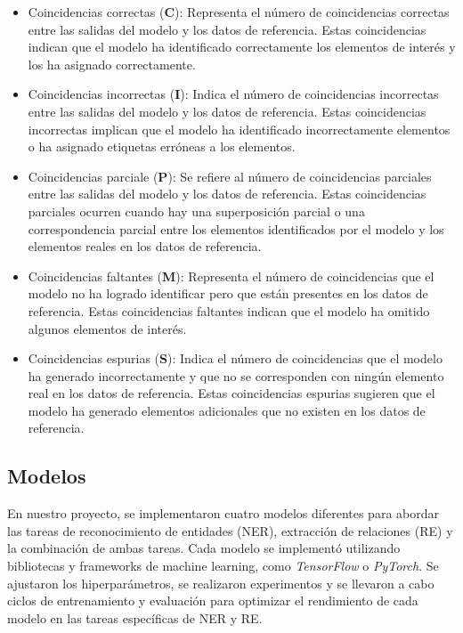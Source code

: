 \documentclass[10pt]{article} %
\begin{document}
	\begin{itemize}
		\item Coincidencias correctas (\textbf{C}): Representa el número de coincidencias correctas entre las salidas del modelo y los datos de referencia. Estas coincidencias indican que el modelo ha identificado correctamente los elementos de interés y los ha asignado correctamente.
		\item Coincidencias incorrectas (\textbf{I}): Indica el número de coincidencias incorrectas entre las salidas del modelo y los datos de referencia. Estas coincidencias incorrectas implican que el modelo ha identificado incorrectamente elementos o ha asignado etiquetas erróneas a los elementos.
		\item Coincidencias parciale (\textbf{P}): Se refiere al número de coincidencias parciales entre las salidas del modelo y los datos de referencia. Estas coincidencias parciales ocurren cuando hay una superposición parcial o una correspondencia parcial entre los elementos identificados por el modelo y los elementos reales en los datos de referencia.
		\item Coincidencias faltantes (\textbf{M}): Representa el número de coincidencias que el modelo no ha logrado identificar pero que están presentes en los datos de referencia. Estas coincidencias faltantes indican que el modelo ha omitido algunos elementos de interés.
		\item Coincidencias espurias (\textbf{S}): Indica el número de coincidencias que el modelo ha generado incorrectamente y que no se corresponden con ningún elemento real en los datos de referencia. Estas coincidencias espurias sugieren que el modelo ha generado elementos adicionales que no existen en los datos de referencia.
				
	\end{itemize}
	
	\subsection*{Modelos}
	
	En nuestro proyecto, se implementaron cuatro modelos diferentes para abordar las tareas de reconocimiento de entidades (NER), extracción de relaciones (RE) y la combinaci\'on de ambas tareas. Cada modelo se implementó utilizando bibliotecas y frameworks de machine learning, como \textit{TensorFlow} o \textit{PyTorch}. Se ajustaron los hiperparámetros, se realizaron experimentos y se llevaron a cabo ciclos de entrenamiento y evaluación para optimizar el rendimiento de cada modelo en las tareas específicas de NER y RE. 
	
\end{document}
